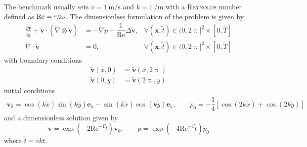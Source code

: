 \documentclass[]{scrartcl}
\newcommand{\pfrac}[2]{\frac{\partial #1}{\partial #2}}
\newcommand{\bs}[1]{\boldsymbol{#1}}
\begin{document}
The benchmark usually sets $v=\SI{1}{\meter\per\second}$ and $k=\SI{1}{\per\meter}$ with a \textsc{Reynolds} number defined as $\textrm{Re} = \sfrac{v}{k\nu}$. The dimensionless formulation of the problem is given by
\begin{subequations}
	\begin{align*}
		\pfrac{\bs{\tilde{v}}}{\tilde{t}} + \bs{\tilde{v}} \cdot (\tilde{\nabla} \otimes \bs{\tilde{v}})&=  -\tilde{\nabla} \tilde{p}+ \dfrac{1}{\mathrm{Re}}\tilde{\Delta} \bs{\tilde{v}} , &\forall (\bs{\tilde{x}}, \tilde{t}) \in (0,2\uppi]^2\times [0, \tilde{T} ] \\
		\tilde{\nabla} \cdot \bs{\tilde{v}}&= 0, &\forall (\bs{\tilde{x}}, \tilde{t}) \in  (0,2\uppi]^2 \times  [0, \tilde{T} ]
	\end{align*}
\end{subequations}
with boundary conditions
\begin{equation*}
	\begin{aligned}
		\bs{\tilde{v}}(x,0) &= \bs{\tilde{v}}(x, 2\uppi)\\
		\bs{\tilde{v}}(0,y) &= \bs{\tilde{v}}(2\uppi,y)
	\end{aligned}
\end{equation*}
initial conditions
\begin{equation*}
	\begin{aligned}
		\bs{v}_0 = \cos( k \tilde{x}) \sin ( k \tilde{y}) \bs{e}_\textrm{x}
		- \sin(  k\tilde{ x}) \cos ( k \tilde{y}) \bs{e}_\textrm{y},
		\qquad
		p_0 = -\dfrac{1}{4}\left[ \cos (2 k \tilde{x}) + \cos ( 2 k \tilde{y})\right]
	\end{aligned}
\end{equation*}
and a dimensionless solution given by
\begin{equation*}
	\bs{\tilde{v}} = \exp (-2 \textrm{Re}^{-1} \tilde{t}) \bs{\tilde{v}}_0,
	\qquad
	\tilde{p} = \exp (-4\textrm{Re}^{-1} \tilde{t})\tilde{p}_0 
\end{equation*}
where $\tilde{t}=vkt$.
\end{document}
